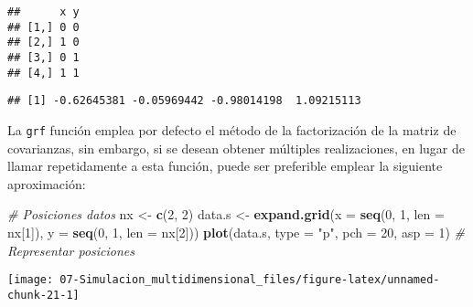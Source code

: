 \documentclass[
]{book}
\newenvironment{Shaded}{\begin{snugshade}}{\end{snugshade}}
\newcommand{\CommentTok}[1]{\textcolor[rgb]{0.56,0.35,0.01}{\textit{#1}}}
\newcommand{\DataTypeTok}[1]{\textcolor[rgb]{0.13,0.29,0.53}{#1}}
\newcommand{\DecValTok}[1]{\textcolor[rgb]{0.00,0.00,0.81}{#1}}
\newcommand{\KeywordTok}[1]{\textcolor[rgb]{0.13,0.29,0.53}{\textbf{#1}}}
\newcommand{\NormalTok}[1]{#1}
\newcommand{\OperatorTok}[1]{\textcolor[rgb]{0.81,0.36,0.00}{\textbf{#1}}}
\newcommand{\StringTok}[1]{\textcolor[rgb]{0.31,0.60,0.02}{#1}}
\theoremstyle{break}
\theoremstyle{definition}
\theoremstyle{definition}
\theoremstyle{definition}
\theoremstyle{remark}
\begin{document}
\begin{Shaded}
\end{Shaded}

\begin{verbatim}
##      x y
## [1,] 0 0
## [2,] 1 0
## [3,] 0 1
## [4,] 1 1
\end{verbatim}

\begin{Shaded}
\end{Shaded}

\begin{verbatim}
## [1] -0.62645381 -0.05969442 -0.98014198  1.09215113
\end{verbatim}

La \texttt{grf} función emplea por defecto el método de la factorización de la matriz de covarianzas,
sin embargo, si se desean obtener múltiples realizaciones, en lugar de llamar repetidamente a esta función,
puede ser preferible emplear la siguiente aproximación:

\begin{Shaded}
\begin{Highlighting}[]
\CommentTok{# Posiciones datos}
\NormalTok{nx <-}\StringTok{ }\KeywordTok{c}\NormalTok{(}\DecValTok{2}\NormalTok{, }\DecValTok{2}\NormalTok{)}
\NormalTok{data.s <-}\StringTok{ }\KeywordTok{expand.grid}\NormalTok{(}\DataTypeTok{x =} \KeywordTok{seq}\NormalTok{(}\DecValTok{0}\NormalTok{, }\DecValTok{1}\NormalTok{, }\DataTypeTok{len =}\NormalTok{ nx[}\DecValTok{1}\NormalTok{]), }\DataTypeTok{y =} \KeywordTok{seq}\NormalTok{(}\DecValTok{0}\NormalTok{, }\DecValTok{1}\NormalTok{, }\DataTypeTok{len =}\NormalTok{ nx[}\DecValTok{2}\NormalTok{]))}
\KeywordTok{plot}\NormalTok{(data.s, }\DataTypeTok{type =} \StringTok{"p"}\NormalTok{, }\DataTypeTok{pch =} \DecValTok{20}\NormalTok{, }\DataTypeTok{asp =} \DecValTok{1}\NormalTok{) }\CommentTok{# Representar posiciones}
\end{Highlighting}
\end{Shaded}

\begin{center}\texttt{[image: 07-Simulacion\_multidimensional\_files/figure-latex/unnamed-chunk-21-1]} \end{center}
\end{document}
